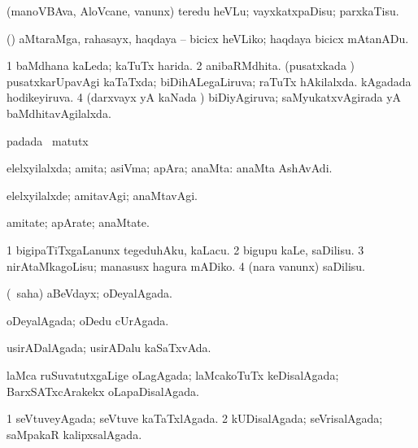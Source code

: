 \bentry
{} 
\gl{\sakirx}
\expl{}
\bmng
(manoVBAva, AloVcane, \mo vanunx) teredu heVLu; vayxkatxpaDisu; parxkaTisu. 
\emng

\noindent 
\gl{\pagu}
\expl{}
\bmng
{} (\AtAmx) aMtaraMga, rahasayx, haqdaya -- bicicx heVLiko; haqdaya bicicx mAtanADu. 
\emng
\eentry

\bentry
{} 
\gl{\gu}
\expl{}
\bmng
\bnum
\num{1} baMdhana kaLeda; kaTuTx harida. 
\num{2} anibaRMdhita. 
 (pusatxkada \vi) 
\banum
{} pusatxkarUpavAgi kaTaTxda; biDihALegaLiruva; raTuTx hAkilalxda. 
 kAgadada hodikeyiruva. 
\eanum
\numie
\num{4} (darxvayx yA kaNada \vi) biDiyAgiruva; saMyukatxvAgirada yA baMdhitavAgilalxda. 
\enum
\emng
\eentry

\bentry
{} 
\gl{\kirx}
\expl{}
\bmng
{} padada \BU\ matutx \BUkaq 
\emng
\eentry

\bentry
{} 
\gl{\gu}
\expl{}
\bmng
elelxyilalxda; amita; asiVma; apAra; anaMta:  anaMta AshAvAdi. 
\emng
\eentry

\bentry
{} 
\gl{\kirxvi}
\expl{}
\bmng
elelxyilalxde; amitavAgi; anaMtavAgi. 
\emng
\eentry

\bentry
{} 
\gl{\nA}
\expl{}
\bmng
amitate; apArate; anaMtate. 
\emng
\eentry

\bentry
{} 
\gl{\sakirx}
\expl{}
\bmng
\bnum
\num{1} bigipaTiTxgaLanunx tegeduhAku, kaLacu. 
\num{2} bigupu kaLe, saDilisu. 
\num{3} nirAtaMkagoLisu; manasusx hagura mADiko. 
\num{4} (nara \mo vanunx) saDilisu. 
\enum
\emng
\eentry

\bentry
{} 
\gl{\gu}
\expl{}
\bmng
(\rUpa\ saha) aBeVdayx; oDeyalAgada. 
\emng
\eentry

\bentry
{} 
\gl{\gu}
\expl{}
\bmng
oDeyalAgada; oDedu cUrAgada. 
\emng
\eentry

\bentry
{} 
\gl{\gu}
\expl{}
\bmng
usirADalAgada; usirADalu kaSaTxvAda. 
\emng
\eentry

\bentry
{} 
\gl{\gu}
\expl{}
\bmng
laMca ruSuvatutxgaLige oLagAgada; laMcakoTuTx keDisalAgada; BarxSATxcArakekx oLapaDisalAgada. 
\emng
\eentry

\bentry
{} 
\gl{\gu}
\expl{}
\bmng
\bnum
\num{1} seVtuveyAgada; seVtuve kaTaTxlAgada. 
\num{2} kUDisalAgada; seVrisalAgada; saMpakaR kalipxsalAgada. 
\enum
\emng
\eentry


